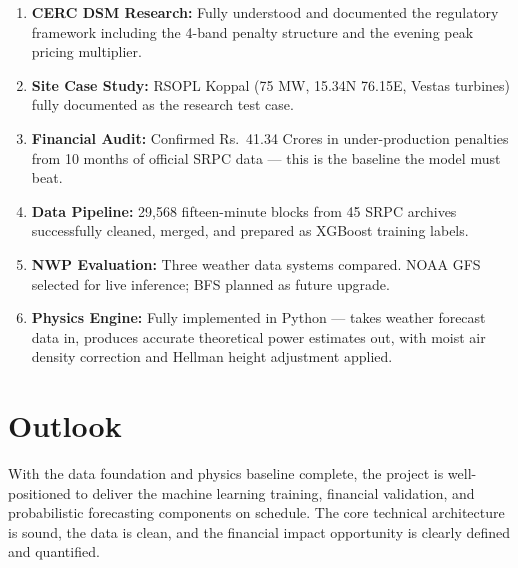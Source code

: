 \documentclass[12pt,a4paper]{report}
\begin{document}
\begin{enumerate}
    \item \textbf{CERC DSM Research:} Fully understood and documented the regulatory framework including the 4-band penalty structure and the evening peak pricing multiplier.
    \item \textbf{Site Case Study:} RSOPL Koppal (75 MW, 15.34\textdegree N 76.15\textdegree E, Vestas turbines) fully documented as the research test case.
    \item \textbf{Financial Audit:} Confirmed Rs.\ 41.34 Crores in under-production penalties from 10 months of official SRPC data --- this is the baseline the model must beat.
    \item \textbf{Data Pipeline:} 29,568 fifteen-minute blocks from 45 SRPC archives successfully cleaned, merged, and prepared as XGBoost training labels.
    \item \textbf{NWP Evaluation:} Three weather data systems compared. NOAA GFS selected for live inference; BFS planned as future upgrade.
    \item \textbf{Physics Engine:} Fully implemented in Python --- takes weather forecast data in, produces accurate theoretical power estimates out, with moist air density correction and Hellman height adjustment applied.
\end{enumerate}

\section{Outlook}

With the data foundation and physics baseline complete, the project is well-positioned to deliver the machine learning training, financial validation, and probabilistic forecasting components on schedule. The core technical architecture is sound, the data is clean, and the financial impact opportunity is clearly defined and quantified.
\end{document}
